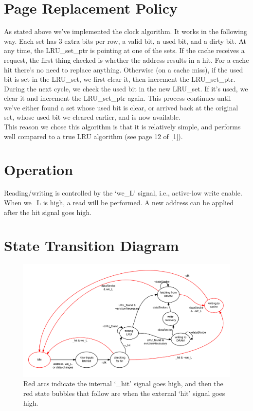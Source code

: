 \documentclass{article}
\begin{document}
\section{Page Replacement Policy}
As stated above we've implemented the clock algorithm.  It works in the following way.  Each set has 3 extra bits per row, a valid bit, a used bit, and a dirty bit.  At any time, the LRU\_set\_ptr is pointing at one of the sets.  If the cache receives a request, the first thing checked is whether the address results in a hit.  For a cache hit there's no need to replace anything.  Otherwise (on a cache miss), if the used bit is set in the LRU\_set, we first clear it, then increment the LRU\_set\_ptr.  During the next cycle, we check the used bit in the new LRU\_set.  If it's used, we clear it and increment the LRU\_set\_ptr again.  This process continues until we've either found a set whose used bit is clear, or arrived back at the original set, whose used bit we cleared earlier, and is now available.\\ 

This reason we chose this algorithm is that it is relatively simple, and performs well compared to a true LRU algorithm (see page 12 of [1]).

\section{Operation} Reading/writing is controlled by the `we\_L' signal, i.e., active-low write enable.  When we\_L is high, a read will be performed. A new address can be applied after the hit signal goes high. 

\section{State Transition Diagram}
\begin{figure}[h]
\includegraphics[scale=0.6]{state-diagram.png}

\caption{Red arcs indicate the internal `\_hit' signal goes high, and then the red state bubbles that follow are when the external `hit' signal goes high.}
\centering
\end{figure}
\end{document}
